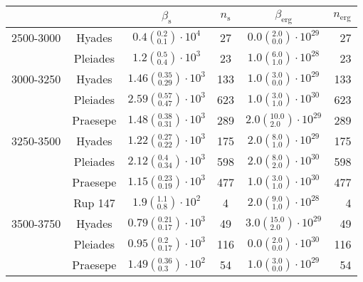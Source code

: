 \begin{tabular}{lccccr}
\hline
          &         &                             $\beta_\mathrm{s}$ & $n_\mathrm{s}$ &                          $\beta_\mathrm{erg}$ & $n_\mathrm{erg}$ \\
\hline
2500-3000 & Hyades &     $0.4\left(^{0.2}_{0.1}\right)\cdot 10^{4}$ &             27 &   $0.0\left(^{2.0}_{0.0}\right)\cdot 10^{29}$ &               27 \\
          & Pleiades &     $1.2\left(^{0.5}_{0.4}\right)\cdot 10^{3}$ &             23 &   $1.0\left(^{6.0}_{1.0}\right)\cdot 10^{28}$ &               23 \\
3000-3250 & Hyades &  $1.46\left(^{0.35}_{0.29}\right)\cdot 10^{3}$ &            133 &   $1.0\left(^{3.0}_{0.0}\right)\cdot 10^{29}$ &              133 \\
          & Pleiades &  $2.59\left(^{0.57}_{0.47}\right)\cdot 10^{3}$ &            623 &   $1.0\left(^{3.0}_{1.0}\right)\cdot 10^{30}$ &              623 \\
          & Praesepe &  $1.48\left(^{0.38}_{0.31}\right)\cdot 10^{3}$ &            289 &  $2.0\left(^{10.0}_{2.0}\right)\cdot 10^{29}$ &              289 \\
3250-3500 & Hyades &  $1.22\left(^{0.27}_{0.22}\right)\cdot 10^{3}$ &            175 &   $2.0\left(^{8.0}_{1.0}\right)\cdot 10^{29}$ &              175 \\
          & Pleiades &   $2.12\left(^{0.4}_{0.34}\right)\cdot 10^{3}$ &            598 &   $2.0\left(^{8.0}_{2.0}\right)\cdot 10^{30}$ &              598 \\
          & Praesepe &  $1.15\left(^{0.23}_{0.19}\right)\cdot 10^{3}$ &            477 &   $1.0\left(^{3.0}_{1.0}\right)\cdot 10^{30}$ &              477 \\
          & Rup 147 &     $1.9\left(^{1.1}_{0.8}\right)\cdot 10^{2}$ &              4 &   $2.0\left(^{9.0}_{1.0}\right)\cdot 10^{28}$ &                4 \\
3500-3750 & Hyades &  $0.79\left(^{0.21}_{0.17}\right)\cdot 10^{3}$ &             49 &  $3.0\left(^{15.0}_{2.0}\right)\cdot 10^{29}$ &               49 \\
          & Pleiades &   $0.95\left(^{0.2}_{0.17}\right)\cdot 10^{3}$ &            116 &   $0.0\left(^{2.0}_{0.0}\right)\cdot 10^{30}$ &              116 \\
          & Praesepe &   $1.49\left(^{0.36}_{0.3}\right)\cdot 10^{2}$ &             54 &   $1.0\left(^{3.0}_{0.0}\right)\cdot 10^{29}$ &               54 \\

\end{tabular}
